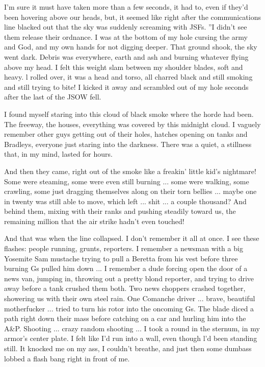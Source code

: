 \documentclass[10pt,a5paper,twoside]{book}
\begin{document}
I'm sure it must have taken more than a few seconds, it had to, even if they'd been hovering above our heads, but, it seemed like right after the communications line blacked out that the sky was suddenly screaming with JSFs. ”I didn't see them release their ordnance. I was at the bottom of my hole cursing the army and God, and my own hands for not digging deeper. That ground shook, the sky went dark. Debris was everywhere, earth and ash and burning whatever flying above my head. I felt this weight slam between my shoulder blades, soft and heavy. l rolled over, it was a head and torso, all charred black and still smoking and still trying to bite! I kicked it away and scrambled out of my hole seconds after the last of the JSOW fell.

I found myself staring into this cloud of black smoke where the horde had been. The freeway, the houses, everything was covered by this midnight cloud. I vaguely remember other guys getting out of their holes, hatches opening on tanks and Bradleys, everyone just staring into the darkness. There was a quiet, a stillness that, in my mind, lasted for hours.

And then they came, right out of the smoke like a freakin' little kid's nightmare! Some were steaming, some were even still burning ... some were walking, some crawling, some just dragging themselves along on their torn bellies ... maybe one in twenty was still able to move, which left ... shit ... a couple thousand? And behind them, mixing with their ranks and pushing steadily toward us, the remaining million that the air strike hadn't even touched!

And that was when the line collapsed. I don't remember it all at once. I see these flashes: people running, grunts, reporters. I remember a newsman with a big Yosemite Sam mustache trying to pull a Beretta from his vest before three burning Gs pulled him down ... I remember a dude forcing open the door of a news van, jumping in, throwing out a pretty blond reporter, and trying to drive away before a tank crushed them both. Two news choppers crashed together, showering us with their own steel rain. One Comanche driver ... brave, beautiful motherfucker ... tried to turn his rotor into the oncoming Gs. The blade diced a path right down their mass before catching on a car and hurling him into the A\&P. Shooting ... crazy random shooting ... I took a round in the sternum, in my armor's center plate. I felt like I'd run into a wall, even though l'd been standing still. It knocked me on my ass, I couldn't breathe, and just then some dumbass lobbed a flash bang right in front of me.
\end{document}
